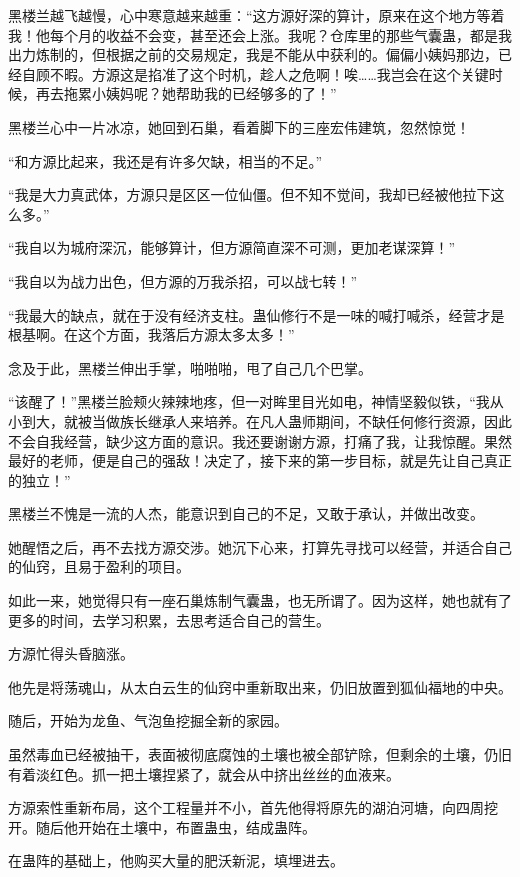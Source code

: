 \begin{this_body}
黑楼兰越飞越慢，心中寒意越来越重：“这方源好深的算计，原来在这个地方等着我！他每个月的收益不会变，甚至还会上涨。我呢？仓库里的那些气囊蛊，都是我出力炼制的，但根据之前的交易规定，我是不能从中获利的。偏偏小姨妈那边，已经自顾不暇。方源这是掐准了这个时机，趁人之危啊！唉……我岂会在这个关键时候，再去拖累小姨妈呢？她帮助我的已经够多的了！”

黑楼兰心中一片冰凉，她回到石巢，看着脚下的三座宏伟建筑，忽然惊觉！

“和方源比起来，我还是有许多欠缺，相当的不足。”

“我是大力真武体，方源只是区区一位仙僵。但不知不觉间，我却已经被他拉下这么多。”

“我自以为城府深沉，能够算计，但方源简直深不可测，更加老谋深算！”

“我自以为战力出色，但方源的万我杀招，可以战七转！”

“我最大的缺点，就在于没有经济支柱。蛊仙修行不是一味的喊打喊杀，经营才是根基啊。在这个方面，我落后方源太多太多！”

念及于此，黑楼兰伸出手掌，啪啪啪，甩了自己几个巴掌。

“该醒了！”黑楼兰脸颊火辣辣地疼，但一对眸里目光如电，神情坚毅似铁，“我从小到大，就被当做族长继承人来培养。在凡人蛊师期间，不缺任何修行资源，因此不会自我经营，缺少这方面的意识。我还要谢谢方源，打痛了我，让我惊醒。果然最好的老师，便是自己的强敌！决定了，接下来的第一步目标，就是先让自己真正的独立！”

黑楼兰不愧是一流的人杰，能意识到自己的不足，又敢于承认，并做出改变。

她醒悟之后，再不去找方源交涉。她沉下心来，打算先寻找可以经营，并适合自己的仙窍，且易于盈利的项目。

如此一来，她觉得只有一座石巢炼制气囊蛊，也无所谓了。因为这样，她也就有了更多的时间，去学习积累，去思考适合自己的营生。

方源忙得头昏脑涨。

他先是将荡魂山，从太白云生的仙窍中重新取出来，仍旧放置到狐仙福地的中央。

随后，开始为龙鱼、气泡鱼挖掘全新的家园。

虽然毒血已经被抽干，表面被彻底腐蚀的土壤也被全部铲除，但剩余的土壤，仍旧有着淡红色。抓一把土壤捏紧了，就会从中挤出丝丝的血液来。

方源索性重新布局，这个工程量并不小，首先他得将原先的湖泊河塘，向四周挖开。随后他开始在土壤中，布置蛊虫，结成蛊阵。

在蛊阵的基础上，他购买大量的肥沃新泥，填埋进去。


\end{this_body}
